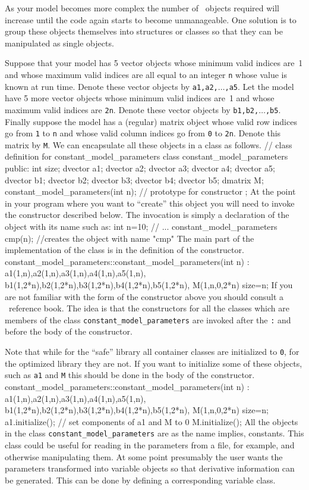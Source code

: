 \documentclass[12pt]{book}
\begin{document}
As your model becomes more complex the number of \AD\
objects required will increase until the code again starts to become
unmanageable. One solution is to group these objects themselves
into structures or classes so that they can be manipulated as
single objects. 

Suppose that your model has 5 vector objects whose minimum valid
indices are~1 and whose maximum valid indices are all equal
to an integer {\tt n} whose value is known at run time. Denote
these vector objects by {\tt a1,a2,$\ldots$,a5}. Let the model
have 5 more vector objects whose minimum valid indices 
are~1 and whose maximum valid indices are {\tt 2n}.  
Denote these vector objects by {\tt b1,b2,$\ldots$,b5}.
Finally suppose the model has a (regular) matrix object whose valid
row indices go from {\tt 1} to {\tt n} and whose valid column
indices go from {\tt 0} to {\tt 2n}. Denote this matrix by {\tt M}.
We can encapsulate all these objects in a class as follows.
\beginexample
// class definition for constant_model_parameters
class constant_model_parameters
{
public:
  int size;
  dvector a1; 
  dvector a2; 
  dvector a3; 
  dvector a4; 
  dvector a5; 
  dvector b1; 
  dvector b2; 
  dvector b3; 
  dvector b4; 
  dvector b5; 
  dmatrix M;
  constant_model_parameters(int n); // prototype for constructor 
};
\endexample
At the point in your program where you want to ``create'' this object
you will need to invoke the constructor described below. The invocation
is simply a declaration of the object with its name such as:
\beginexample
int n=10;
// ...
constant_model_parameters cmp(n); //creates the object with name "cmp"
\endexample
The main part of the implementation of the class is in the definition
of the constructor.  
\beginexample
 constant_model_parameters::constant_model_parameters(int n) :
   a1(1,n),a2(1,n),a3(1,n),a4(1,n),a5(1,n), 
   b1(1,2*n),b2(1,2*n),b3(1,2*n),b4(1,2*n),b5(1,2*n), 
   M(1,n,0,2*n) {size=n;}
\endexample
\noindent If you are not familiar with the form of the constructor above
you should consult a \cplus\ reference book. The idea is that the
constructors for all the classes which are members of
the class {\tt constant\_model\_parameters}
are invoked after the {\tt :} and before the body of the constructor.

Note that while for the ``safe'' library all
container classes are initialized to {\tt 0}, for the optimized
library they are not. If you want to initialize some of these
objects, such as {\tt a1} and {\tt M} this should be done
in the body of the constructor.
\beginexample
 constant_model_parameters::constant_model_parameters(int n) :
   a1(1,n),a2(1,n),a3(1,n),a4(1,n),a5(1,n), 
   b1(1,2*n),b2(1,2*n),b3(1,2*n),b4(1,2*n),b5(1,2*n), 
   M(1,n,0,2*n) 
 {
   size=n; 
   a1.initialize();  // set components of a1 and M to 0
   M.initialize();
 }
\endexample
All the objects in the class {\tt constant\_model\_parameters}
are as the name implies, constants. This class could be useful for reading in 
the parameters from a file, for example, and otherwise manipulating 
them. At some point presumably the user wants the parameters
transformed into variable objects so that derivative information
can be generated. This can be done by defining a corresponding 
variable class.
\end{document}
